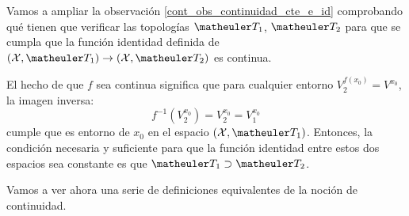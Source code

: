 \begin{exa}
	Vamos a ampliar la observación \ref{cont_obs_continuidad_cte_e_id} comprobando qué tienen que verificar las topologías $\T_1$, $\T_2$ para que se cumpla que la función identidad definida de $(\X,\T_1)\to(\X,\T_2)$ es continua.
	
	El hecho de que $f$ sea continua significa que para cualquier entorno $V_2^{f(x_0)} = V^{x_0}$, la imagen inversa:
	\[f^{-1}(V_2^{x_0})=V_2^{x_0}=V_1^{x_0}\]
	cumple que es entorno de $x_0$ en el espacio $(\X,\T_1)$. Entonces, la condición necesaria y suficiente para que la función identidad entre estos dos espacios sea constante es que $\T_1\supset \T_2$.
\end{exa}

Vamos a ver ahora una serie de definiciones equivalentes de la noción de continuidad.

